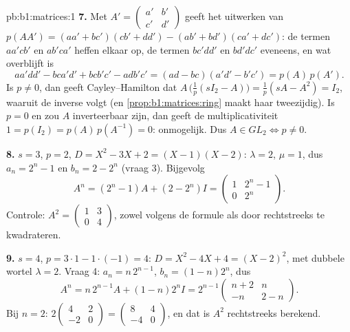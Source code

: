 \begin{solution}{pb:b1:matrices:1}
\textbf{7.} Met $A' = \begin{pmatrix} a' & b'\\ c' &
d'\end{pmatrix}$ geeft het uitwerken van $p(AA') = (aa' + bc')(cb'
+ dd') - (ab' + bd')(ca' + dc')$: de termen $aa'cb'$ en $ab'ca'$
heffen elkaar op, de termen $bc'dd'$ en $bd'dc'$ eveneens, en wat
overblijft is
\[
aa'dd' - bca'd' + bcb'c' - adb'c'
= (ad - bc)(a'd' - b'c') = p(A)\,p(A').
\]
Is $p \neq 0$, dan geeft Cayley--Hamilton dat
$A\,\bigl(\tfrac1p(sI_2 - A)\bigr) = \tfrac1p(sA - A^2) = I_2$,
waaruit de inverse volgt (en \cref{prop:b1:matrices:ring} maakt
haar tweezijdig). Is $p = 0$ en zou $A$ inverteerbaar zijn, dan
geeft de multiplicativiteit $1 = p(I_2) = p(A)\,p(A^{-1}) = 0$:
onmogelijk. Dus $A \in GL_2 \iff p \neq 0$.

\textbf{8.} $s = 3$, $p = 2$, $D = X^2 - 3X + 2 = (X - 1)(X - 2)$:
$\lambda = 2$, $\mu = 1$, dus $a_n = 2^n - 1$ en $b_n = 2 - 2^n$
(vraag 3). Bijgevolg
\[
A^n = (2^n - 1)A + (2 - 2^n)I
= \begin{pmatrix} 1 & 2^n - 1\\ 0 & 2^n \end{pmatrix}.
\]
Controle: $A^2 = \begin{pmatrix} 1 & 3\\ 0 & 4\end{pmatrix}$,
zowel volgens de formule als door rechtstreeks te kwadrateren.

\textbf{9.} $s = 4$, $p = 3\cdot1 - 1\cdot(-1) = 4$: $D = X^2 - 4X
+ 4 = (X - 2)^2$, met dubbele wortel $\lambda = 2$. Vraag 4: $a_n =
n\,2^{n-1}$, $b_n = (1 - n)2^n$, dus
\[
A^n = n\,2^{n-1}A + (1 - n)2^n I
= 2^{n-1}\begin{pmatrix} n + 2 & n\\ -n & 2 - n
\end{pmatrix}.
\]
Bij $n = 2$: $2\begin{pmatrix} 4 & 2\\ -2 & 0\end{pmatrix} =
\begin{pmatrix} 8 & 4\\ -4 & 0 \end{pmatrix}$, en dat is $A^2$
rechtstreeks berekend.


\end{solution}
